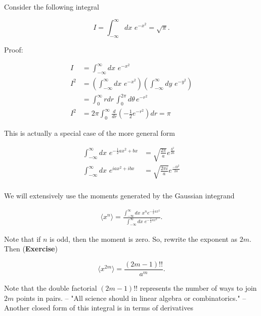 \noindent Consider the following integral 

\begin{equation}
I = \int_{-\infty}^\infty dx \,\, e^{-x^2} = \sqrt{\pi}.
\end{equation}

\noindent Proof:

\begin{align}
I &= \int_{-\infty}^\infty dx \,\, e^{-x^2} \\
I^2 &= \left(\int_{-\infty}^\infty dx \,\, e^{-x^2} \right) \left( \int_{-\infty}^\infty dy \,\, e^{-y^2}  \right) \\
&= \int_0^\infty r dr \, \int_0^{2\pi} d\theta \, e^{-r^2} \\
I^2 &= 2 \pi \int_0^\infty \frac{d}{dr} \left( -\frac{1}{2} e^{-r^2} \right) dr = \pi
\end{align}

\noindent This is actually a special case of the more general form

\begin{align}
\int_{-\infty}^\infty dx \,\, e^{ -\frac{1}{2} a x^2 + b x } &= \sqrt{\frac{2\pi}{a}} e^{ \frac{b^2}{2a}  } \\
\int_{-\infty}^\infty dx \,\, e^{  i a x^2 + i b x } &= \sqrt{\frac{2\pi i}{a}} e^{ \frac{-i b^2}{2a}  } \\
\end{align}

\noindent We will extensively use the moments generated by the Gaussian integrand

\begin{align}
\langle x^n \rangle = \frac{\int_{-\infty}^\infty dx \,\, x^n e^{ -\frac{1}{2} a x^2}}{\int_{-\infty}^\infty dx \,\, e^{ -\frac{1}{2} a x^2}}.
\end{align}

\noindent Note that if $n$ is odd, then the moment is zero. So, rewrite the exponent as $2m$. Then (\textbf{Exercise})

\begin{equation}
\langle x^{2m} \rangle = \frac{(2m-1)!!}{a^m}.
\end{equation}

\noindent Note that the double factorial $(2m-1)!!$ represents the number of ways to join $2m$ points in pairs. -- "All science should in linear algebra or combinatorics." -- \\

\noindent Another closed form of this integral is in terms of derivatives

